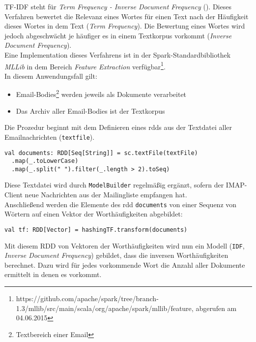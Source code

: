 TF-IDF steht für \textit{Term Frequency - Inverse Document Frequency} (\cite{SparckJones:1988:SIT:106765.106782}). Dieses Verfahren bewertet die Relevanz eines Wortes für einen Text nach der Häufigkeit dieses Wortes in dem Text (\textit{Term Frequency}). Die Bewertung eines Wortes wird jedoch abgeschwächt je häufiger es in einem Textkorpus vorkommt (\textit{Inverse Document Frequency}).\\

Eine Implementation dieses Verfahrens ist in der Spark-Standardbibliothek \textit{MLLib} in dem Bereich \textit{Feature Extraction} verfügbar\footnote{https://github.com/apache/spark/tree/branch-1.3/mllib/src/main/scala/org/apache/spark/mllib/feature, abgerufen am 04.06.2015}.\\

In diesem Anwendungsfall gilt:
\begin{itemize}
\item Email-Bodies\footnote{Textbereich einer Email} werden jeweils als Dokumente verarbeitet
\item Das Archiv aller Email-Bodies ist der Textkorpus
\end{itemize}

Die Prozedur beginnt mit dem Definieren eines \gls{rdd}s aus der Textdatei aller Emailnachrichten (\lstinline|textfile|).\\

\begin{lstlisting}
val documents: RDD[Seq[String]] = sc.textFile(textFile)
  .map(_.toLowerCase)
  .map(_.split(" ").filter(_.length > 2).toSeq)
\end{lstlisting}

Diese Textdatei wird durch \lstinline|ModelBuilder| regelmäßig ergänzt, sofern der IMAP-Client neue Nachrichten aus der Mailingliste empfangen hat.\\

Anschließend werden die Elemente des \gls{rdd} \lstinline|documents| von einer Sequenz von Wörtern auf einen Vektor der Worthäufigkeiten abgebildet:

\begin{lstlisting}
val tf: RDD[Vector] = hashingTF.transform(documents)
\end{lstlisting}

Mit diesem RDD von Vektoren der Worthäufigkeiten wird nun ein Modell (\lstinline|IDF|, \textit{Inverse Document Frequency}) gebildet, dass die inversen Worthäufigkeiten berechnet. Dazu wird für jedes vorkommende Wort die Anzahl aller Dokumente ermittelt in denen es vorkommt.\\

